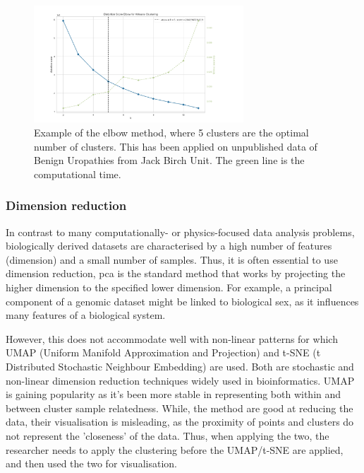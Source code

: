\begin{figure}[!htb]
  \centering\includegraphics[width=0.7\textwidth,height=0.5\textheight,keepaspectratio]{Images/Clustering/elbow_method.png}
    \caption{Example of the elbow method, where 5 clusters are the optimal number of clusters. This has been applied on unpublished data of Benign Uropathies from Jack Birch Unit. The green line is the computational time. }
    \label{fig:elbow_method}
\end{figure}
\FloatBarrier


\subsubsection{Dimension reduction} \label{s:lit:dim_red}

In contrast to many computationally- or physics-focused data analysis problems, biologically derived datasets are characterised by a high number of features (dimension) and a small number of samples. Thus, it is often essential to use dimension reduction, \acrfull{pca} is the standard method that works by projecting the higher dimension to the specified lower dimension. For example, a principal component of a genomic dataset might be linked to biological sex, as it influences many features of a biological system.

However, this does not accommodate well with non-linear patterns for which UMAP (Uniform Manifold Approximation and Projection) and t-SNE (t Distributed Stochastic Neighbour Embedding) are used. Both are stochastic and non-linear dimension reduction techniques widely used in bioinformatics. UMAP is gaining popularity as it's been more stable in representing both within and between cluster sample relatedness. While, the method are good at reducing the data, their visualisation is misleading, as the proximity of points and clusters do not represent the 'closeness' of the data. Thus, when applying the two, the researcher needs to apply the clustering before the UMAP/t-SNE are applied, and then used the two for visualisation.

